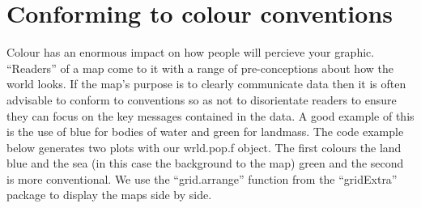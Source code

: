 \documentclass[]{article}
\begin{document}
\section{Conforming to colour conventions}

Colour has an enormous impact on how people will percieve your graphic.
``Readers'' of a map come to it with a range of pre-conceptions about
how the world looks. If the map's purpose is to clearly communicate data
then it is often advisable to conform to conventions so as not to
disorientate readers to ensure they can focus on the key messages
contained in the data. A good example of this is the use of blue for
bodies of water and green for landmass. The code example below generates
two plots with our wrld.pop.f object. The first colours the land blue
and the sea (in this case the background to the map) green and the
second is more conventional. We use the ``grid.arrange'' function from
the ``gridExtra'' package to display the maps side by side.
\end{document}
